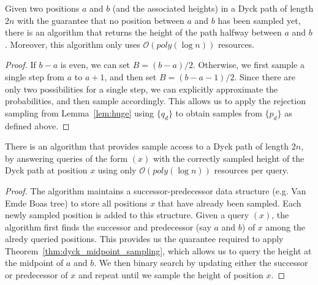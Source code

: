 \begin{theorem}
\label{thm:dyck_midpoint_sampling}
Given two positions $a$ and $b$ (and the associated heights) in a Dyck path of length $2n$
with the guarantee that no position between $a$ and $b$ has been sampled yet,
there is an algorithm that returns the height of the path halfway between $a$ and $b$.
Moreover, this algorithm only uses $\mathcal O(poly(\log n))$ resources.
\end{theorem}
\begin{proof}
If $b-a$ is even, we can set $B = (b-a)/2$.
Otherwise, we first sample a single step from $a$ to $a+1$, and then set $B = (b-a-1)/2$.
Since there are only two possibilities for a single step, we can explicitly approximate the probabilities, and then sample accordingly.
This allows us to apply the rejection sampling from Lemma~\ref{lem:huge} using $\{ q_d\}$ to obtain samples from $\{ p_d\}$ as defined above.
\end{proof}

\begin{theorem}
\label{thm:dyck_height_sampling}
There is an algorithm that provides sample access to a Dyck path of length $2n$,
by answering queries of the form $(x)$ with the correctly sampled height of the Dyck path at position $x$
using only $\mathcal O(poly(\log n))$ resources per query.
\end{theorem}
\begin{proof}
The algorithm maintains a successor-predecessor data structure (e.g. Van Emde Boas tree) to store all positions $x$ that have already been sampled.
Each newly sampled position is added to this structure.
Given a query $(x)$, the algorithm first finds the successor and predecessor (say $a$ and $b$) of $x$ among the alredy queried positions.
This provides us the quarantee required to apply Theorem~\ref{thm:dyck_midpoint_sampling},
which allows us to query the height at the midpoint of $a$ and $b$.
We then binary search by updating either the successor or predecessor of $x$ and repeat until we sample the height of position $x$.
\end{proof}




